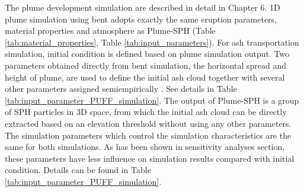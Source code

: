 
The plume development simulation are described in detail in Chapter 6. 1D plume simulation using bent adopts exactly the same eruption parameters, material properties and atmosphere as Plume-SPH (Table \ref{tab:material_properties}, Table \ref{tab:input_parameters}).
For ash transportation simulation, initial condition is defined based on plume simulation output. Two parameters obtained directly from bent simulation, the horizontal spread and height of plume, are used to define the initial ash cloud together with several other parameters assigned semiempirically \citep{bursik2012estimation}. See details in Table \ref{tab:input_parameter_PUFF_simulation}. The output of Plume-SPH is a group of SPH particles in 3D space, from which the initial ash cloud can be directly extracted based on an elevation threshold without using any other parameters. The simulation parameters which control the simulation characteristics are the same for both simulations. As has been shown in sensitivity analyses section, these parameters have less influence on simulation results compared with initial condition. Details can be found in Table \ref{tab:input_parameter_PUFF_simulation}.

